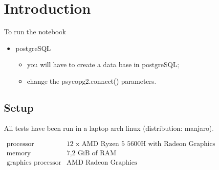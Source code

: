 \section{Introduction}\label{sec:introduction}

To run the notebook

\begin{itemize}[label=\(\blacktriangleright\)]
    \item postgreSQL
          \begin{itemize}[label=\(\blacktriangleright\)]
              \item you will have to create a data base in postgreSQL;
              \item change the psycopg2.connect() parameters.
          \end{itemize}
\end{itemize}

\subsection{Setup}\label{sec:setup}

All tests have been run in a laptop arch linux (distribution: manjaro).

$\begin{matrix}
        \text{processor}          & \text{12 x AMD Ryzen 5 5600H with Radeon Graphics} \\
        \text{memory}             & \text{7,2 GiB of RAM}                              \\
        \text{graphics processor} & \text{AMD Radeon Graphics}                         \\
    \end{matrix}$

